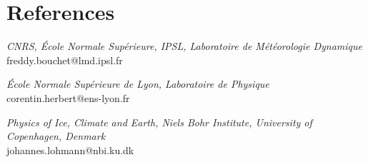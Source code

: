 \documentclass[11pt, a4 paper]{article}
\begin{document}
\section*{References}
\begin{description}[style=multiline,leftmargin=4cm,align=right]
  \item[Freddy Bouchet]
    \emph{CNRS, \'Ecole Normale Sup\'erieure, IPSL, Laboratoire de M\'et\'eorologie Dynamique} \\
    freddy.bouchet@lmd.ipsl.fr
  \item[Corentin Herbert]
    \emph{\'Ecole Normale Sup\'erieure de Lyon, Laboratoire de Physique} \\
    corentin.herbert@ens-lyon.fr
  \item[Johannes Lohmann]
    \emph{Physics of Ice, Climate and Earth, Niels Bohr Institute,
    University of Copenhagen, Denmark} \\
    johannes.lohmann@nbi.ku.dk

\end{description}

% 


\end{document}
